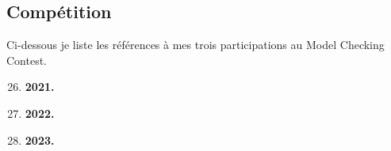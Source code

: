 \subsection{Compétition}
\vspace{10pt}

Ci-dessous je liste les références à mes trois participations au Model Checking Contest.
\vspace{10pt}
\begin{enumerate}
  \setcounter{enumi}{25}
  \item \textbf{2021.} \smallbreak
  \item \textbf{2022.} \smallbreak
  \item \textbf{2023.} 
\end{enumerate}
